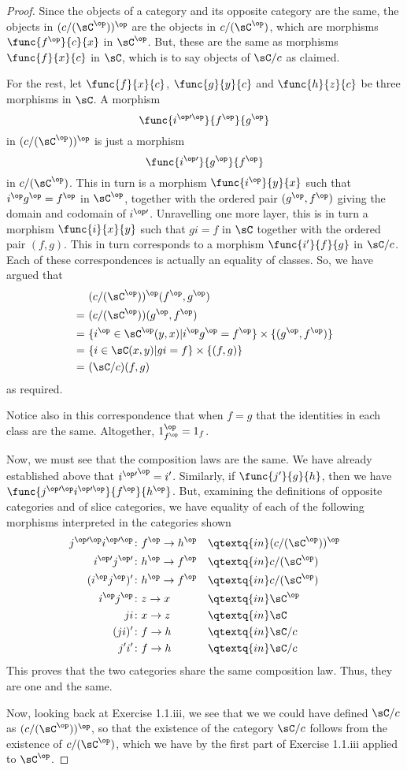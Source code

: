 \documentclass[main.tex]{subfiles}
\begin{document}
\begin{proof}
Since the objects of a category and its opposite category are the same, the
objects in \((c/(\sC^\op))^\op\) are the objects in \(c/(\sC^\op)\), which are
morphisms \(\func{f^\op}{c}{x}\) in \(\sC^\op\). But, these are the same as
morphisms \(\func{f}{x}{c}\) in \(\sC\), which is to say objects of \(\sC/c\)
as claimed.

For the rest, let \(\func{f}{x}{c}\), \(\func{g}{y}{c}\) and \(\func{h}{z}{c}\)
be three morphisms in \(\sC\). A morphism
\[\func{i^{\op\prime\op}}{f^\op}{g^\op}\] in \((c/(\sC^\op))^\op\) is just
a morphism \[\func{i^{\op\prime}}{g^\op}{f^\op}\] in \(c/(\sC^\op)\). This in
turn is a morphism \(\func{i^\op}{y}{x}\) such that \(i^\op g^\op=f^\op\) in
\(\sC^\op\), together with the ordered pair \((g^\op,f^\op)\) giving the domain
and codomain of \(i^{\op\prime}\). Unravelling one more layer, this is in turn a
morphism \(\func{i}{x}{y}\) such that \(gi=f\) in \(\sC\) together with the
ordered pair \((f,g)\). This in turn corresponds to a morphism
\(\func{i'}{f}{g}\) in \(\sC/c\). Each of these correspondences is
actually an equality of classes. So, we have argued that
\begin{align*}
		&(c/(\sC^\op))^\op(f^\op, g^\op)\\
	=\ &(c/(\sC^\op))(g^\op, f^\op)\\
	=\ &\{i^\op\in\sC^\op(y,x)|i^\op g^\op=f^\op\}\times\{(g^\op,f^\op)\}\\
	=\ &\{i\in\sC(x,y)|gi=f\}\times\{(f,g)\}\\
	=\ &(\sC/c)(f,g)\\
\end{align*}
as required.

Notice also in this correspondence that when \(f=g\) that the identities in each
class are the same. Altogether, \(1_{f^\op}^\op=1_f\).

Now, we must see that the composition laws are the same. We have already
established above that \({i^{\op\prime}}^\op=i'\). Similarly, if
\(\func{j'}{g}{h}\), then we have
\(\func{j^{\op\prime\op}i^{\op\prime\op}}{f^\op}{h^\op}\). But,
examining the definitions of opposite categories and of slice categories, we
have equality of each of the following morphisms interpreted in the categories
shown
\begin{alignat*}{2}
	j^{\op\prime\op}i^{\op\prime\op}\colon&f^\op\to h^\op&&\qtextq{ in }(c/(\sC^\op))^\op\\
	i^{\op\prime}j^{\op\prime}\colon&h^\op\to f^\op&&\qtextq{ in }c/(\sC^\op)\\
	(i^\op j^\op)'\colon&h^\op\to f^\op&&\qtextq{ in }c/(\sC^\op)\\
	i^\op j^\op\colon&z\to x&&\qtextq{ in }\sC^\op\\
	ji\colon&x\to z&&\qtextq{ in }\sC\\
	(ji)'\colon&f\to h&&\qtextq{ in }\sC/c\\
	j' i'\colon&f\to h&&\qtextq{ in }\sC/c
\end{alignat*}
This proves that the two categories share the same composition law. Thus, they
are one and the same.

Now, looking back at Exercise 1.1.iii, we see that we we could have defined
\(\sC/c\) as \((c/(\sC^\op))^\op\), so that the existence of the category
\(\sC/c\) follows from the existence of \(c/(\sC^\op)\), which we have by the
first part of Exercise 1.1.iii applied to \(\sC^\op\).
\end{proof}
\end{document}
